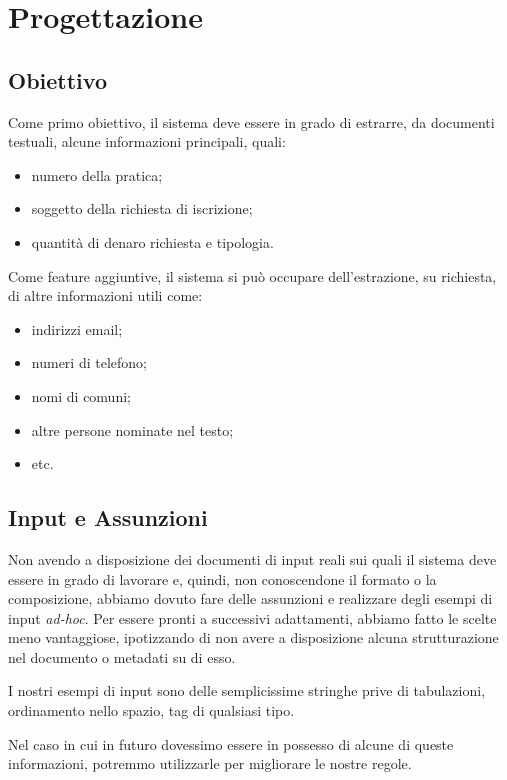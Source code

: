 
\section{Progettazione}

\label{sec:Progettazione}

\subsection{Obiettivo}
Come primo obiettivo, il sistema deve essere in grado di estrarre, da documenti testuali, alcune informazioni principali, quali:
\begin{itemize}
\item numero della pratica;
\item soggetto della richiesta di iscrizione;
\item quantità di denaro richiesta e tipologia.
\end{itemize}

Come feature aggiuntive, il sistema si può occupare dell'estrazione, su richiesta, di altre informazioni utili come:
\begin{itemize}
\item indirizzi email;
\item numeri di telefono;
\item nomi di comuni;
\item altre persone nominate nel testo;
\item etc.
\end{itemize}

\subsection{Input e Assunzioni}
Non avendo a disposizione dei documenti di input reali sui quali il sistema deve essere in grado di lavorare e, quindi, non conoscendone il formato o la composizione, abbiamo dovuto fare delle assunzioni e realizzare degli esempi di input \emph{ad-hoc}.
Per essere pronti a successivi adattamenti, abbiamo fatto le scelte meno vantaggiose, ipotizzando di non avere a disposizione alcuna strutturazione nel documento o metadati su di esso.

I nostri esempi di input sono delle semplicissime stringhe prive di tabulazioni, ordinamento nello spazio, tag di qualsiasi tipo.

Nel caso in cui in futuro dovessimo essere in possesso di alcune di queste informazioni, potremmo utilizzarle per migliorare le nostre regole.


